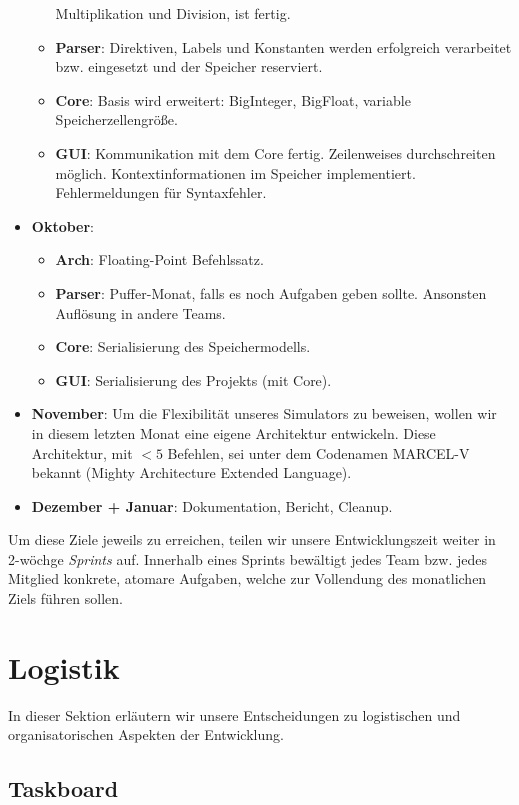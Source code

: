 \begin{itemize}
\begin{itemize}
        Multiplikation und Division, ist fertig.
      \item \textbf{Parser}: Direktiven, Labels und Konstanten werden
        erfolgreich verarbeitet bzw. eingesetzt und der Speicher reserviert.
      \item \textbf{Core}: Basis wird erweitert: BigInteger, BigFloat, variable Speicherzellengröße.
      \item \textbf{GUI}: Kommunikation mit dem Core fertig. Zeilenweises
        durchschreiten möglich. Kontextinformationen im Speicher
        implementiert. Fehlermeldungen für Syntaxfehler.
    \end{itemize}
  \item \textbf{Oktober}:
    \begin{itemize}
      \item \textbf{Arch}: Floating-Point Befehlssatz.
      \item \textbf{Parser}: Puffer-Monat, falls es noch Aufgaben geben
        sollte. Ansonsten Auflösung in andere Teams.
      \item \textbf{Core}: Serialisierung des Speichermodells.
      \item \textbf{GUI}: Serialisierung des Projekts (mit Core).
    \end{itemize}
  \item \textbf{November}: Um die Flexibilität unseres Simulators zu beweisen,
    wollen wir in diesem letzten Monat eine eigene Architektur entwickeln. Diese
    Architektur, mit $< 5$ Befehlen, sei unter dem Codenamen MARCEL-V bekannt
    (Mighty Architecture Extended Language).
  \item \textbf{Dezember + Januar}: Dokumentation, Bericht, Cleanup.
\end{itemize}


Um diese Ziele jeweils zu erreichen, teilen wir unsere Entwicklungszeit weiter
in 2-wöchge \emph{Sprints} auf. Innerhalb eines Sprints bewältigt jedes Team
bzw. jedes Mitglied konkrete, atomare Aufgaben, welche zur Vollendung des
monatlichen Ziels führen sollen.

\section{Logistik}

In dieser Sektion erläutern wir unsere Entscheidungen zu logistischen und
organisatorischen Aspekten der Entwicklung.

\subsection{Taskboard}

